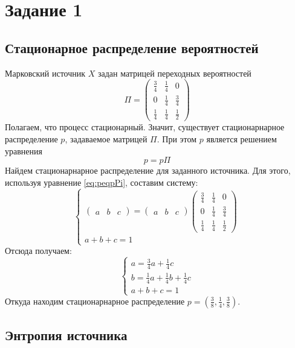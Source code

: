 \section{Задание 1}

\subsection{Стационарное распределение вероятностей}

Марковский источник $X$ задан матрицей переходных вероятностей 
$$
\Pi=
\begin{pmatrix}
\frac{3}{4} & \frac{1}{4} & 0 \\ 
0 & \frac{1}{4} & \frac{3}{4} \\ 
\frac{1}{4} & \frac{1}{4} & \frac{1}{2} \end{pmatrix}$$ 
Полагаем, что процесс стационарный.
Значит, существует стационарнарное распределение $p$, задаваемое матрицей $\Pi.$
При этом $p$ является решением уравнения \begin{equation}\label{eq:peqpPi}p=p\Pi\end{equation}
Найдем стационарнарное распределение для заданного источника.
Для этого, используя уравнение \ref{eq:peqpPi}, составим систему:
$$
\begin{cases}
\left( \begin{matrix} a & b & c \end{matrix} \right) =
\begin{pmatrix}a & b & c \end{pmatrix}
\begin{pmatrix}
\frac{3}{4} & \frac{1}{4} & 0 \\
0 & \frac{1}{4} & \frac{3}{4} \\
\frac{1}{4} & \frac{1}{4} & \frac{1}{2}
\end{pmatrix} \\
a + b + c = 1
\end{cases}
$$
Отсюда получаем:
$$
\begin{cases} 
a = \frac{3}{4}a + \frac{1}{4}c \\
b = \frac{1}{4}a + \frac{1}{4}b + \frac{1}{4}c\\
a + b + c = 1
\end{cases}
$$
Откуда находим стационарнарное распределение $p = \left( \frac{3}{8} ,\frac{1}{4} ,\frac{3}{8} \right).$

\subsection{Энтропия источника}

